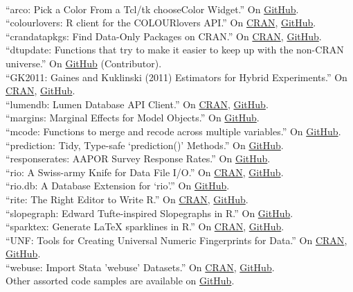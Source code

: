 \documentclass[12pt]{article}
\renewcommand{\section}[1]{\pagebreak[3]%
    \llap{\scshape\smash{\parbox[t]{\marginparwidth}{\raggedright {\color{lg}#1}}}}%
    \vspace{-\baselineskip}\par}
\newcommand{\topic}[1]{\pagebreak[3]\indent {\color{lg}{\footnotesize #1 }}\\}
\newcommand{\entry}[1]{\indent {\color{lg}\guillemotright}\hspace{2pt}#1\vspace{.25em}\\}
\begin{document}
\section{Software}
\topic{R Packages}
	\entry{``arco: Pick a Color From a Tcl/tk chooseColor Widget.'' On \href{https://github.com/leeper/arco}{GitHub}.}
	\entry{``colourlovers: R client for the COLOURlovers API.'' On \href{https://cran.r-project.org/package=colourlovers}{CRAN}, \href{https://github.com/leeper/colourlovers}{GitHub}.}
	\entry{``crandatapkgs: Find Data-Only Packages on CRAN.'' On \href{https://cran.r-project.org/package=crandatapkgs}{CRAN}, \href{https://github.com/leeper/crandatapkgs}{GitHub}.}
	\entry{``dtupdate: Functions that try to make it easier to keep up with the non-CRAN universe.'' On \href{https://github.com/hrbrmstr/dtupdate}{GitHub} (Contributor).}
	\entry{``GK2011: Gaines and Kuklinski (2011) Estimators for Hybrid Experiments.'' On \href{https://cran.r-project.org/package=GK2011}{CRAN}, \href{https://github.com/leeper/GK2011}{GitHub}.}
	\entry{``lumendb: Lumen Database API Client.'' On \href{https://cran.r-project.org/package=lumendb}{CRAN}, \href{https://github.com/leeper/lumendb}{GitHub}.}
	\entry{``margins: Marginal Effects for Model Objects.'' On \href{https://github.com/leeper/margins}{GitHub}.}
	\entry{``mcode: Functions to merge and recode across multiple variables.'' On \href{https://github.com/leeper/mcode}{GitHub}.}
	\entry{``prediction: Tidy, Type-safe `prediction()' Methods.'' On \href{https://github.com/leeper/prediction}{GitHub}.}
	\entry{``responserates: AAPOR Survey Response Rates.'' On \href{https://github.com/leeper/responserates}{GitHub}.}
	\entry{``rio: A Swiss-army Knife for Data File I/O.'' On \href{https://cran.r-project.org/package=rio}{CRAN}, \href{https://github.com/leeper/rio}{GitHub}.}
	\entry{``rio.db: A Database Extension for `rio'.'' On \href{https://github.com/leeper/rio.db}{GitHub}.}
	\entry{``rite: The Right Editor to Write R.'' On \href{https://cran.r-project.org/package=rite}{CRAN}, \href{https://github.com/leeper/rio}{GitHub}.}
	\entry{``slopegraph: Edward Tufte-inspired Slopegraphs in R.'' On \href{https://github.com/leeper/slopegraph}{GitHub}.}
	\entry{``sparktex: Generate LaTeX sparklines in R.'' On \href{https://cran.r-project.org/package=sparktex}{CRAN}, \href{https://github.com/leeper/sparktex}{GitHub}.}
	\entry{``UNF: Tools for Creating Universal Numeric Fingerprints for Data.'' On \href{https://cran.r-project.org/package=UNF}{CRAN}, \href{https://github.com/leeper/UNF}{GitHub}.}
	\entry{``webuse: Import Stata 'webuse' Datasets.'' On \href{https://cran.r-project.org/package=webuse}{CRAN}, \href{https://github.com/leeper/webuse}{GitHub}.}
	\entry{Other assorted code samples are available on \href{http://github.com/leeper}{GitHub}.}
\end{document}
